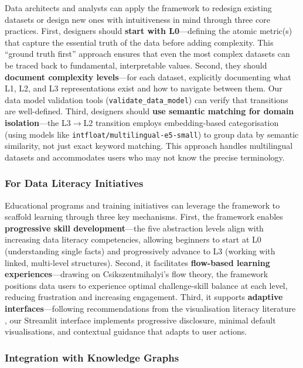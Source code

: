 \documentclass[12pt,a4paper]{article}
\begin{document}
Data architects and analysts can apply the framework to redesign existing datasets or design new ones with intuitiveness in mind through three core practices. First, designers should \textbf{start with L0}---defining the atomic metric(s) that capture the essential truth of the data before adding complexity. This ``ground truth first'' approach ensures that even the most complex datasets can be traced back to fundamental, interpretable values. Second, they should \textbf{document complexity levels}---for each dataset, explicitly documenting what L1, L2, and L3 representations exist and how to navigate between them. Our data model validation tools (\texttt{validate\_data\_model}) can verify that transitions are well-defined. Third, designers should \textbf{use semantic matching for domain isolation}---the L3$\to$L2 transition employs embedding-based categorisation (using models like \texttt{intfloat/multilingual-e5-small}) to group data by semantic similarity, not just exact keyword matching. This approach handles multilingual datasets and accommodates users who may not know the precise terminology.

\subsubsection{For Data Literacy Initiatives}

Educational programs and training initiatives can leverage the framework to scaffold learning through three key mechanisms. First, the framework enables \textbf{progressive skill development}---the five abstraction levels align with increasing data literacy competencies, allowing beginners to start at L0 (understanding single facts) and progressively advance to L3 (working with linked, multi-level structures). Second, it facilitates \textbf{flow-based learning experiences}---drawing on Csikszentmihalyi's flow theory, the framework positions data users to experience optimal challenge-skill balance at each level, reducing frustration and increasing engagement. Third, it supports \textbf{adaptive interfaces}---following recommendations from the visualisation literacy literature \citep{alhamadi2022dataqualitymismatched, amyrotos2021adaptivevisualisationsfor}, our Streamlit interface implements progressive disclosure, minimal default visualisations, and contextual guidance that adapts to user actions.

\subsubsection{Integration with Knowledge Graphs}
\end{document}

